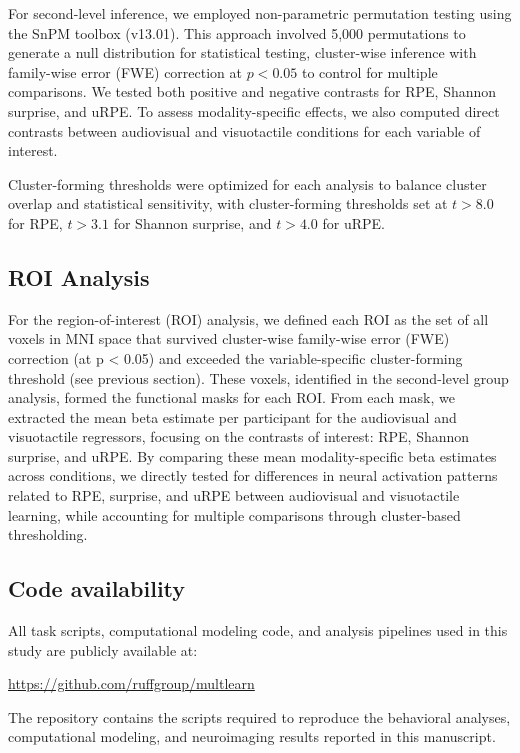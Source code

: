 \documentclass{article}
\begin{document}
For second-level inference, we employed non-parametric permutation testing using the SnPM toolbox (v13.01). This approach involved 5,000 permutations to generate a null distribution for statistical testing, cluster-wise inference with family-wise error (FWE) correction at $p < 0.05$ to control for multiple comparisons. We tested both positive and negative contrasts for RPE, Shannon surprise, and uRPE. To assess modality-specific effects, we also computed direct contrasts between audiovisual and visuotactile conditions for each variable of interest.

Cluster-forming thresholds were optimized for each analysis to balance cluster overlap and statistical sensitivity, with cluster-forming thresholds set at $t > 8.0$ for RPE, $t > 3.1$ for Shannon surprise, and $t > 4.0$ for uRPE.

\subsection*{ROI Analysis}

For the region-of-interest (ROI) analysis, we defined each ROI as the set of all voxels in MNI space that survived cluster-wise family-wise error (FWE) correction (at p < 0.05) and exceeded the variable-specific cluster-forming threshold (see previous section). These voxels, identified in the second-level group analysis, formed the functional masks for each ROI. From each mask, we extracted the mean beta estimate per participant for the audiovisual and visuotactile regressors, focusing on the contrasts of interest: RPE, Shannon surprise, and uRPE. By comparing these mean modality-specific beta estimates across conditions, we directly tested for differences in neural activation patterns related to RPE, surprise, and uRPE between audiovisual and visuotactile learning, while accounting for multiple comparisons through cluster-based thresholding.


\subsection*{Code availability}

All task scripts, computational modeling code, and analysis pipelines used in this study are publicly available at:

\url{https://github.com/ruffgroup/multlearn}

The repository contains the scripts required to reproduce the behavioral analyses, computational modeling, and neuroimaging results reported in this manuscript.
\end{document}
